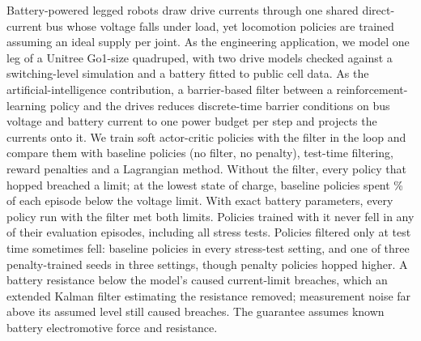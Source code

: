 Battery-powered legged robots draw drive currents through one shared direct-current bus whose voltage falls under load, yet locomotion policies are trained assuming an ideal supply per joint. As the engineering application, we model one leg of a Unitree Go1-size quadruped, with two drive models checked against a switching-level simulation and a battery fitted to public cell data. As the artificial-intelligence contribution, a barrier-based filter between a reinforcement-learning policy and the drives reduces discrete-time barrier conditions on bus voltage and battery current to one power budget per step and projects the currents onto it. We train soft actor-critic policies with the filter in the loop and compare them with baseline policies (no filter, no penalty), test-time filtering, reward penalties and a Lagrangian method. Without the filter, every policy that hopped breached a limit; at the lowest state of charge, baseline policies spent \% of each episode below the voltage limit. With exact battery parameters, every policy run with the filter met both limits. Policies trained with it never fell in any of their  evaluation episodes, including all stress tests. Policies filtered only at test time sometimes fell: baseline policies in every stress-test setting, and one of three penalty-trained seeds in three settings, though penalty policies hopped higher. A battery resistance below the model's caused current-limit breaches, which an extended Kalman filter estimating the resistance removed; measurement noise far above its assumed level still caused breaches. The guarantee assumes known battery electromotive force and resistance.
